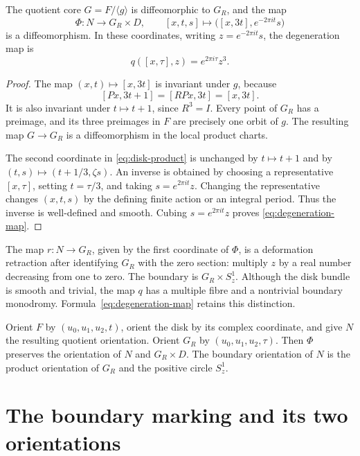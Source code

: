 \documentclass[11pt]{article}
\numberwithin{equation}{section}
\begin{document}
\begin{proposition}\label{prop:disk-product}
The quotient core $G=F/\langle g\rangle$ is diffeomorphic to $G_R$,
and the map
\begin{equation}\label{eq:disk-product}
 \Phi:N\longrightarrow G_R\times D,
 \qquad [x,t,s]\longmapsto\bigl([x,3t],e^{-2\pi it}s\bigr)
\end{equation}
is a diffeomorphism. In these coordinates, writing $z=e^{-2\pi it}s$,
the degeneration map is
\begin{equation}\label{eq:degeneration-map}
                   q([x,\tau],z)=e^{2\pi i\tau}z^3.
\end{equation}
\end{proposition}
\begin{proof}
The map $(x,t)\mapsto[x,3t]$ is invariant under $g$, because
\[
 [Px,3t+1]=[RPx,3t]=[x,3t].
\]
It is also invariant under $t\mapsto t+1$, since $R^3=I$.
Every point of $G_R$ has a preimage, and its three preimages in $F$
are precisely one orbit of $g$. The resulting map $G\to G_R$
is a diffeomorphism in the local product charts.

The second coordinate in \eqref{eq:disk-product} is unchanged by
$t\mapsto t+1$ and by $(t,s)\mapsto(t+1/3,\zeta s)$.
An inverse is obtained by choosing a representative $[x,\tau]$,
setting $t=\tau/3$, and taking $s=e^{2\pi it}z$.
Changing the representative changes $(x,t,s)$ by the defining finite
action or an integral period. Thus the inverse is well-defined and
smooth. Cubing $s=e^{2\pi it}z$ proves
\eqref{eq:degeneration-map}.
\end{proof}

The map $r:N\to G_R$, given by the first coordinate of $\Phi$,
is a deformation retraction after identifying $G_R$ with the zero
section: multiply $z$ by a real number decreasing from one to zero.
The boundary is $G_R\times S^1_z$. Although the disk bundle is smooth
and trivial, the map $q$ has a multiple fibre and a nontrivial boundary
monodromy. Formula~\eqref{eq:degeneration-map} retains this distinction.

Orient $F$ by $(u_0,u_1,u_2,t)$, orient the disk by its complex
coordinate, and give $N$ the resulting quotient orientation.
Orient $G_R$ by $(u_0,u_1,u_2,\tau)$. Then $\Phi$ preserves the
orientation of $N$ and $G_R\times D$. The boundary orientation of
$N$ is the product orientation of $G_R$ and the positive circle $S^1_z$.

\section{The boundary marking and its two orientations}
\end{document}
